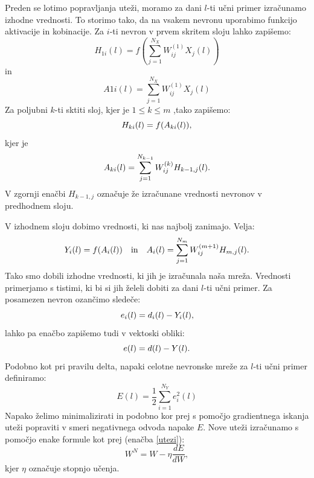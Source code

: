 \documentclass[mat1]{fmfdelo}
\begin{document}
Preden se lotimo popravljanja uteži, moramo za dani $l$-ti učni primer izračunamo izhodne vrednosti. To storimo tako, da na vsakem nevronu uporabimo funkcijo aktivacije in kobinacije. Za $i$-ti nevron v prvem skritem sloju lahko zapišemo:
%
\begin{equation*}
H_{1i}(l) = f\left( \sum^{N_X}_{j=1}{W^{(1)}_{ij}X_j(l)}\right)
\end{equation*}
%
in
%
\begin{equation*}
A{1i}(l) =\sum^{N_X}_{j=1}{W^{(1)}_{ij}X_j(l)}
\end{equation*}
%
Za poljubni $k$-ti sktiti sloj, kjer je $1\leq k \leq m$ ,tako zapišemo:
%
\begin{equation*}
H_{ki}(l) = f(A_{ki}(l))\text,
\end{equation*}
%
kjer je
%
\begin{equation*}
A_{ki}(l) = \sum^{N_{k-1}}_{j=1}W^{(k)}_{ij}H_{k-1,j}(l)\text.
\end{equation*}
%
V zgornji enačbi $H_{k-1,j}$ označuje že izračunane vrednosti nevronov v predhodnem sloju.
 
 V izhodnem sloju dobimo vrednosti, ki nas najbolj zanimajo. Velja:
%
\begin{equation*}
Y_{i}(l) = f(A_{i}(l)) \quad \text{in} \quad A_{i}(l) = \sum^{N_{m}}_{j=1}{W^{(m+1)}_{ij}H_{m,j}(l)}\text.
\end{equation*}
%
Tako smo dobili izhodne vrednosti, ki jih je izračunala naša mreža. Vrednosti primerjamo s tistimi, ki bi si jih želeli dobiti za dani $l$-ti učni primer. Za posamezen nevron ozančimo sledeče:
%
\begin{equation}
e_i(l) = d_i(l) - Y_i(l)\text,
\end{equation}
lahko pa enačbo zapišemo tudi v vektoski obliki:
\begin{equation*}
e(l) = d(l) - Y(l)\text.
\end{equation*}
Podobno kot pri pravilu delta, napaki celotne nevronske mreže za $l$-ti učni primer definiramo:
%
\begin{equation}
E(l) = \frac{1}{2}\sum^{N_Y}_{i=1}e_i^2(l)
\label{napaka}
\end{equation}
%
Napako želimo minimalizirati in podobno kor prej s pomočjo gradientnega iskanja uteži popraviti v smeri negativnega odvoda napake $E$. Nove uteži izračunamo s pomočjo enake formule kot prej (enačba \eqref{utezi}):
\begin{equation*}
W^{N} = W - \eta \frac{dE}{dW}, 
\end{equation*}
%
kjer $\eta$ označuje stopnjo učenja. 
\end{document}

